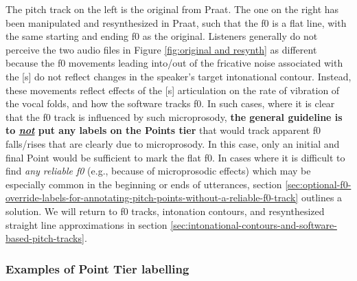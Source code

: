 \documentclass[11pt, twoside]{memoir}
\begin{document}
The pitch track on the left is the original from Praat. The one on the right has been manipulated and resynthesized in Praat, such that the f0 is a flat line, with the same starting and ending f0 as the original. Listeners generally do not perceive the two audio files in Figure \ref{fig:original and resynth} as different because the f0 movements leading into\slash out of the fricative noise associated with the [s] do not reflect changes in the speaker’s target intonational contour.  Instead, these movements reflect effects of the [s] articulation on the rate of vibration of the vocal folds, and how the software tracks f0. In such cases, where it is clear that the f0 track is influenced by such microprosody, \textbf{the general guideline is to \textit{\uline{not}} put any labels on the Points tier} that would track apparent f0 falls\slash rises that are clearly due to microprosody. In this case, only an initial and final Point would be sufficient to mark the flat f0.
In cases where it is difficult to find \textit{any reliable f0} (e.g., because of microprosodic effects) which may be especially common in the beginning or ends of utterances, section \ref{sec:optional-f0-override-labels-for-annotating-pitch-points-without-a-reliable-f0-track} outlines a solution.
We will return to f0 tracks, intonation contours, and resynthesized straight line approximations in section \ref{sec:intonational-contours-and-software-based-pitch-tracks}.
\subsubsection{Examples of Point Tier labelling}\label{sec:examples-of-point-tier-labelling}
\end{document}
